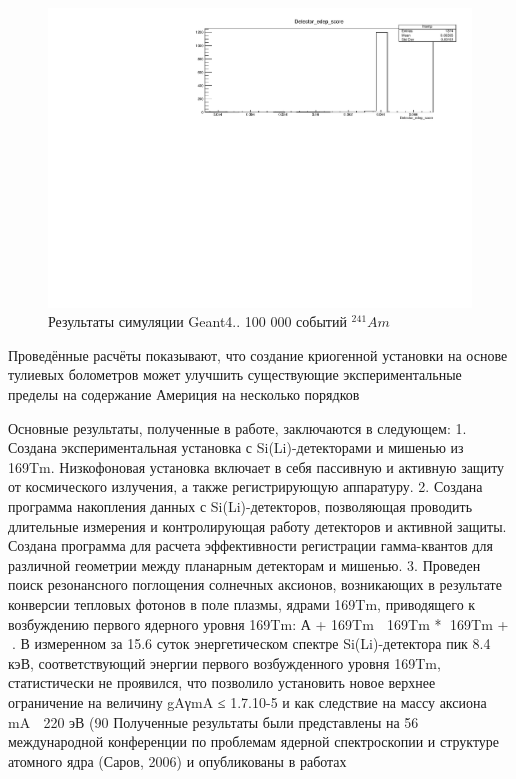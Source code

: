 \documentclass[a4paper,article,14pt]{extarticle}
\begin{document}
\begin{figure}[ht]
\begin{center}
   \includegraphics[width = \textwidth]{images/232_Th_100000events.pdf}
\caption{
\label{graph-fig}
     Результаты симуляции Geant4.. 100 000 событий $^{241}Am$
     }
\end {center}
\end {figure}

\newpage

Проведённые расчёты показывают, что создание криогенной установки на основе тулиевых болометров может улучшить существующие экспериментальные пределы на содержание Америция на несколько порядков
\pagebreak

Основные результаты, полученные в работе, заключаются в
следующем:
1. Создана экспериментальная установка с Si(Li)-детекторами и
мишенью из 169Tm. Низкофоновая установка включает в себя пассивную и
активную защиту от космического излучения, а также регистрирующую
аппаратуру.
2. Создана программа накопления данных с Si(Li)-детекторов,
позволяющая проводить длительные измерения и контролирующая работу
детекторов и активной защиты. Создана программа для расчета
эффективности регистрации гамма-квантов для различной геометрии между
планарным детекторам и мишенью.
3. Проведен поиск резонансного поглощения солнечных аксионов,
возникающих в результате конверсии тепловых фотонов в поле плазмы,
ядрами 169Tm, приводящего к возбуждению первого ядерного уровня 169Tm: А
+ 169Tm  169Tm * 169Tm + . В измеренном за 15.6 суток энергетическом
спектре Si(Li)-детектора пик 8.4 кэВ, соответствующий энергии первого
возбужденного уровня 169Tm, статистически не проявился, что позволило
установить новое верхнее ограничение на величину gAγmA ≤ 1.7.10-5 и как
следствие на массу аксиона mA  220 эВ (90%
Полученные результаты были представлены на 56 международной
конференции по проблемам ядерной спектроскопии и структуре атомного
ядра (Саров, 2006) и опубликованы в работах
\end{document}
